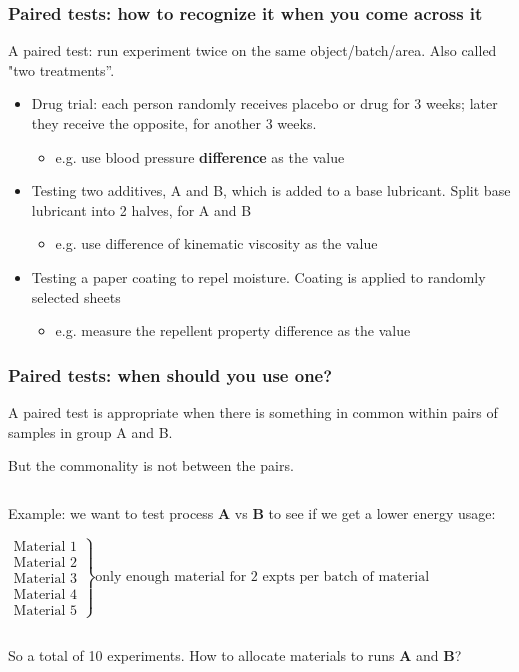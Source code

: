\begin{frame}\frametitle{Paired tests: how to recognize it when you come across it}

	A paired test: run experiment twice on the same object/batch/area. Also called {\color{purple}"two treatments''}.
	
	\vspace{24pt}
	\begin{itemize}
		\item	Drug trial: each person randomly receives placebo or drug for 3 weeks; later they receive the opposite, for another 3 weeks.
		\begin{itemize}
			\item	e.g. use blood pressure \textbf{difference} as the value
		\end{itemize}
		\item	Testing two additives, A and B, which is added to a base lubricant. Split base lubricant into 2 halves, for A and B
		\begin{itemize}
			\item	e.g. use difference of kinematic viscosity as the value
		\end{itemize}
		\item	Testing a paper coating to repel moisture. Coating is applied to randomly selected sheets
		\begin{itemize}
			\item	e.g. measure the repellent property difference as the value
		\end{itemize}
	\end{itemize}
\end{frame}

\begin{frame}\frametitle{Paired tests: when should you use one?}

	A paired test is appropriate when there is something in common within pairs of samples in group A and B.

	But the commonality is not between the pairs.

	$\qquad$

	Example: we want to test process \textbf{A} vs \textbf{B} to see if we get a lower energy usage:

	$ \left.
	\begin{array}{r}
		\text{Material 1}\\
		\text{Material 2}\\
		\text{Material 3}\\
		\text{Material 4}\\
		\text{Material 5}
	\end{array}
	\right\} \text{only enough material for 2 expts per batch of material} $

	$\qquad$

	So a total of 10 experiments. How to allocate materials to runs \textbf{A} and \textbf{B}?
\end{frame}

